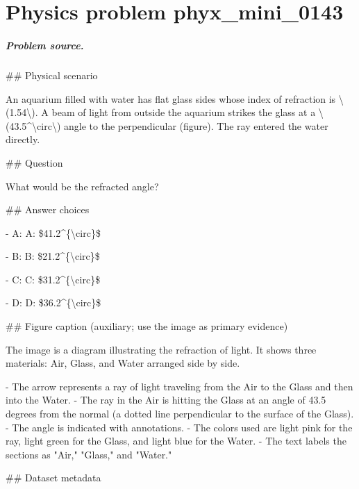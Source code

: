 
\chapter{Physics problem phyx\_mini\_0143}
\label{ch:PhyXMiniProblems_problem_phyx_mini_0143}

\paragraph{Problem source.}
\#\# Physical scenario

An aquarium filled with water has flat glass sides whose index of refraction is \textbackslash{}(1.54\textbackslash{}). A beam of light from outside the aquarium strikes the glass at a \textbackslash{}(43.5\textasciicircum{}\textbackslash{}circ\textbackslash{}) angle to the perpendicular (figure). The ray entered the water directly.

\#\# Question

What would be the refracted angle?

\#\# Answer choices

- A: A: \$41.2\textasciicircum{}\{\textbackslash{}circ\}\$

- B: B: \$21.2\textasciicircum{}\{\textbackslash{}circ\}\$

- C: C: \$31.2\textasciicircum{}\{\textbackslash{}circ\}\$

- D: D: \$36.2\textasciicircum{}\{\textbackslash{}circ\}\$

\#\# Figure caption (auxiliary; use the image as primary evidence)

The image is a diagram illustrating the refraction of light. It shows three materials: Air, Glass, and Water arranged side by side. 

- The arrow represents a ray of light traveling from the Air to the Glass and then into the Water.
- The ray in the Air is hitting the Glass at an angle of 43.5 degrees from the normal (a dotted line perpendicular to the surface of the Glass).
- The angle is indicated with annotations.
- The colors used are light pink for the ray, light green for the Glass, and light blue for the Water.
- The text labels the sections as "Air," "Glass," and "Water."

\#\# Dataset metadata

